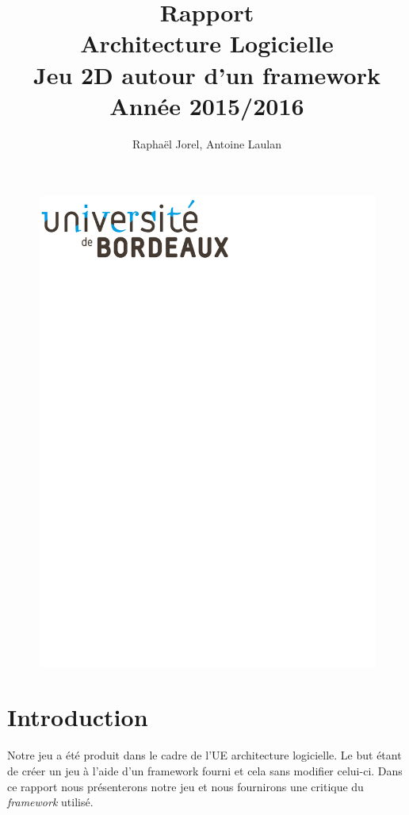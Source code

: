 \documentclass[a4paper,10pt]{article}
\title{Rapport\\Architecture Logicielle\\Jeu 2D autour d'un framework\\Année 2015/2016 }
\author{Raphaël Jorel, Antoine Laulan}
\begin{document}
\begin{figure}
    \begin{center}
    \includegraphics[scale=0.7]{images/logo-bdx.pdf}
    \end{center}
\end{figure}
\maketitle

\newpage



\newpage
\section{Introduction }
Notre jeu a été produit dans le cadre de l'UE architecture logicielle. Le but étant de créer un jeu à l'aide
d'un framework fourni et cela sans modifier celui-ci.
Dans ce rapport nous présenterons notre jeu et nous fournirons une critique du \textit{framework} utilisé. \\
\end{document}
